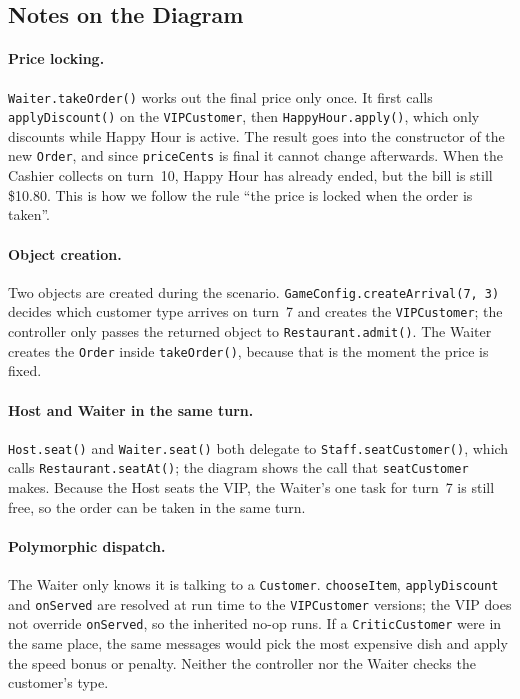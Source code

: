 \subsection{Notes on the Diagram}

\begin{sloppypar}
\paragraph{Price locking.} \texttt{Waiter.takeOrder()} works out the final price only once. It first calls \texttt{applyDiscount()} on the \texttt{VIPCustomer}, then \texttt{HappyHour.apply()}, which only discounts while Happy Hour is active. The result goes into the constructor of the new \texttt{Order}, and since \texttt{priceCents} is final it cannot change afterwards. When the Cashier collects on turn~10, Happy Hour has already ended, but the bill is still \$10.80. This is how we follow the rule ``the price is locked when the order is taken''.
\end{sloppypar}

\begin{sloppypar}
\paragraph{Object creation.} Two objects are created during the scenario. \texttt{GameConfig.createArrival(7, 3)} decides which customer type arrives on turn~7 and creates the \texttt{VIPCustomer}; the controller only passes the returned object to \texttt{Restaurant.admit()}. The Waiter creates the \texttt{Order} inside \texttt{takeOrder()}, because that is the moment the price is fixed.
\end{sloppypar}

\begin{sloppypar}
\paragraph{Host and Waiter in the same turn.} \texttt{Host.seat()} and \texttt{Waiter.seat()} both delegate to \texttt{Staff.seatCustomer()}, which calls \texttt{Restaurant.seatAt()}; the diagram shows the call that \texttt{seatCustomer} makes. Because the Host seats the VIP, the Waiter's one task for turn~7 is still free, so the order can be taken in the same turn.
\end{sloppypar}

\paragraph{Polymorphic dispatch.} The Waiter only knows it is talking to a \texttt{Customer}. \texttt{chooseItem}, \texttt{applyDiscount} and \texttt{onServed} are resolved at run time to the \texttt{VIPCustomer} versions; the VIP does not override \texttt{onServed}, so the inherited no-op runs. If a \texttt{CriticCustomer} were in the same place, the same messages would pick the most expensive dish and apply the speed bonus or penalty. Neither the controller nor the Waiter checks the customer's type.

